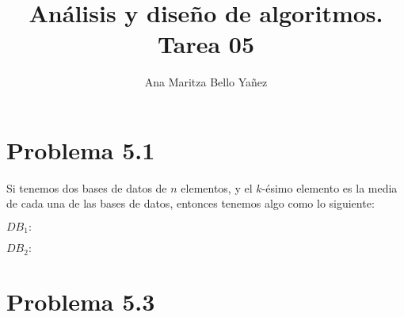 \documentclass{article}
\begin{document}
\title{Análisis y diseño de algoritmos. \\ Tarea 05}
\author{Ana Maritza Bello Yañez}
\maketitle
\setlength{\parindent}{0pt}
\setlength{\parskip}{1em}

\section*{Problema 5.1}


Si tenemos dos bases de datos de $n$ elementos, y el $k$-ésimo elemento es la
media de cada una de las bases de datos, entonces tenemos algo como lo
siguiente:

\begin{center}
    $DB_1:$
\end{center}

\begin{center}
    $DB_2:$
\end{center}

\section*{Problema 5.3}
\end{document}
